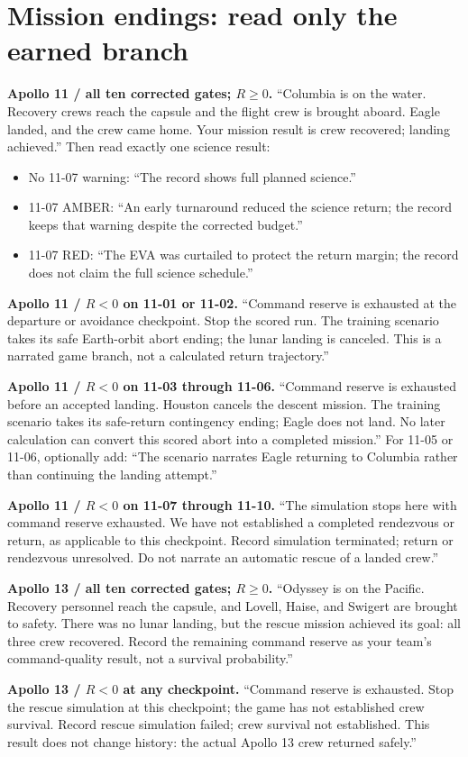 \clearpage
\section*{Mission endings: read only the earned branch}
\textbf{Apollo 11 / all ten corrected gates; \(R\geq0\).}
``Columbia is on the water. Recovery crews reach the capsule and
the flight crew is brought aboard. Eagle landed, and the crew came
home. Your mission result is crew recovered; landing achieved.''
Then read exactly one science result:
\begin{itemize}
\item No 11-07 warning: ``The record shows full planned science.''
\item 11-07 AMBER: ``An early turnaround reduced the science return;
the record keeps that warning despite the corrected budget.''
\item 11-07 RED: ``The EVA was curtailed to protect the return margin;
the record does not claim the full science schedule.''
\end{itemize}

\textbf{Apollo 11 / \(R<0\) on 11-01 or 11-02.}
``Command reserve is exhausted at the departure or avoidance checkpoint.
Stop the scored run. The training scenario takes its safe Earth-orbit
abort ending; the lunar landing is canceled.
This is a narrated game branch, not a calculated return trajectory.''

\textbf{Apollo 11 / \(R<0\) on 11-03 through 11-06.}
``Command reserve is exhausted before an accepted landing.
Houston cancels the descent mission. The training scenario takes
its safe-return contingency ending; Eagle does not land.
No later calculation can convert this scored abort into a completed mission.''
For 11-05 or 11-06, optionally add:
``The scenario narrates Eagle returning to Columbia rather than
continuing the landing attempt.''

\textbf{Apollo 11 / \(R<0\) on 11-07 through 11-10.}
``The simulation stops here with command reserve exhausted.
We have not established a completed rendezvous or return, as applicable
to this checkpoint. Record simulation terminated; return or rendezvous
unresolved. Do not narrate an automatic rescue of a landed crew.''

\textbf{Apollo 13 / all ten corrected gates; \(R\geq0\).}
``Odyssey is on the Pacific. Recovery personnel reach the capsule,
and Lovell, Haise, and Swigert are brought to safety.
There was no lunar landing, but the rescue mission achieved its goal:
all three crew recovered. Record the remaining command reserve
as your team's command-quality result, not a survival probability.''

\textbf{Apollo 13 / \(R<0\) at any checkpoint.}
``Command reserve is exhausted. Stop the rescue simulation at this
checkpoint; the game has not established crew survival.
Record rescue simulation failed; crew survival not established.
This result does not change history: the actual Apollo 13 crew returned safely.''
